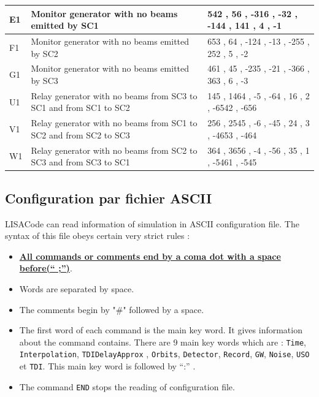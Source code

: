\documentclass[a4paper,english,12pt]{article}
\begin{document}
\begin{table}[p]
\begin{center}
\begin{tabular}{|p{}|p{}|p{}|}
\hline
E1 & Monitor generator with no beams emitted by SC1 & 542 , 56 , -316 , -32 , -144 , 141 , 4 , -1  \\ 
\hline
F1 & Monitor generator with no beams emitted by SC2 & 653 , 64 , -124 , -13 , -255 , 252 , 5 , -2  \\ 
\hline
G1 & Monitor generator with no beams emitted by SC3 & 461 , 45 , -235 , -21 , -366 , 363 , 6 , -3  \\ 
\hline
U1 & Relay generator with no beams from SC3 to SC1 and  from SC1 to SC2 & 145 , 1464 , -5 , -64 , 16 , 2 , -6542 , -656  \\ 
\hline
V1 & Relay generator with no beams from SC1 to SC2 and  from SC2 to SC3 & 256 , 2545 , -6 , -45 , 24 , 3 , -4653 , -464  \\ 
\hline
W1 & Relay generator with no beams from SC2 to SC3 and  from SC3 to SC1 & 364 , 3656 , -4 , -56 , 35 , 1 , -5461 , -545  \\ 
\hline
\end{tabular} 
\end{center} 
\label{table_paramTDI} 
\end{table}


\newpage


\subsection{Configuration par fichier ASCII}
\label{SSConfACII}

LISACode can read information of simulation in ASCII configuration file. The syntax of this file obeys certain very strict rules :
\begin{itemize}
\item \underline{\bf All commands or comments end by a coma dot with a space before(`` ;'')}. 
\item Words are separated by space.
\item The comments begin by "\#" followed by a space.
\item The first word of each command is the main key word. It gives information about the command contains. There are 9 main key words which are :  \texttt{Time}, \texttt{Interpolation}, \texttt{TDIDelayApprox} , \texttt{Orbits}, \texttt{Detector}, \texttt{Record}, \texttt{GW}, \texttt{Noise}, \texttt{USO} et \texttt{TDI}. This main key word is followed by ``:'' .
\item The command \texttt{END} stops the reading of configuration file.
\end{itemize}
\end{document}
